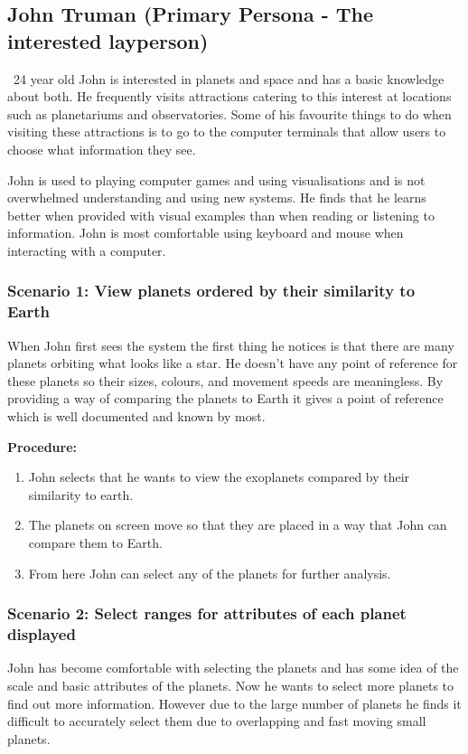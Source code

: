 \subsection{John Truman (Primary Persona - The interested layperson)}\
24 year old John is interested in planets and space and has a basic knowledge
about both. He frequently visits attractions catering to this interest at
locations such as planetariums and observatories. Some of his favourite things
to do when visiting these attractions is to go to the computer terminals that
allow users to choose what information they see.

John is used to playing computer games and using visualisations and is not
overwhelmed understanding and using new systems. He finds that he learns better
when provided with visual examples than when reading or listening to
information. John is most comfortable using keyboard and mouse when interacting
with a computer.

\subsubsection{Scenario 1: View planets ordered by their similarity to Earth}
 When John first sees the system the first thing he notices is that there are
many planets orbiting what looks like a star. He doesn't have any point of
reference for these planets so their sizes, colours, and movement speeds are
meaningless. By providing a way of comparing the planets to Earth it gives a
point of reference which is well documented and known by most.
 
 {\bf Procedure:}
 \begin{enumerate}
 \item John selects that he wants to view the exoplanets compared by their
similarity to earth.
 \item The planets on screen move so that they are placed in a way that John can
compare them to Earth.
 \item From here John can select any of the planets for further analysis.
 \end{enumerate}

  \subsubsection{Scenario 2: Select ranges for attributes of each planet
displayed}
 John has become comfortable with selecting the planets and has some idea of the
scale and basic attributes of the planets. Now he wants to select more planets
to find out more information. However due to the large number of planets he
finds it difficult to accurately select them due to overlapping and fast moving
small planets.
 
